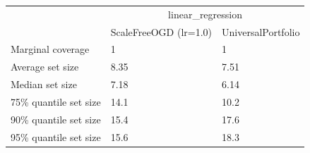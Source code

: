 \begin{tabular}{lll}
\toprule
& \multicolumn{2}{c}{linear_regression} \\
& ScaleFreeOGD (lr=1.0) & UniversalPortfolio \\
\midrule
Marginal coverage & 1 & 1 \\
Average set size & 8.35 & 7.51 \\
Median set size & 7.18 & 6.14 \\
75\% quantile set size & 14.1 & 10.2 \\
90\% quantile set size & 15.4 & 17.6 \\
95\% quantile set size & 15.6 & 18.3 \\
\bottomrule
\end{tabular}
